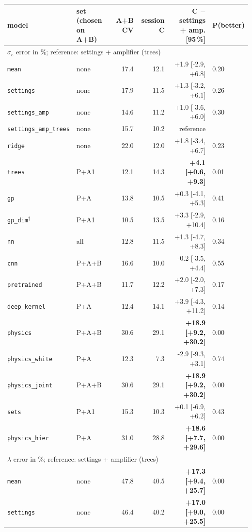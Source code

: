 \begin{tabular}{llrrrl}
\toprule
model & set (chosen on A+B) & A+B CV & session C & C $-$ settings + amp. [95\,\%] & P(better) \\
\midrule
\multicolumn{6}{l}{\textbf{$\sigma_e$} \quad error in \%; reference: settings + amplifier (trees)} \\
\midrule
\texttt{mean} & none & 17.4 & 12.1 & +1.9 [-2.9, +6.8] & 0.20 \\
\texttt{settings} & none & 17.9 & 11.5 & +1.3 [-3.2, +6.1] & 0.26 \\
\texttt{settings\_amp} & none & 14.6 & 11.2 & +1.0 [-3.6, +6.0] & 0.30 \\
\texttt{settings\_amp\_trees} & none & 15.7 & 10.2 & reference &  \\
\texttt{ridge} & none & 22.0 & 12.0 & +1.8 [-3.4, +6.7] & 0.23 \\
\texttt{trees} & P+A1 & 12.1 & 14.3 & \textbf{+4.1 [+0.6, +9.3]} & 0.01 \\
\texttt{gp} & P+A & 13.8 & 10.5 & +0.3 [-4.1, +5.3] & 0.41 \\
\texttt{gp\_dim}$^{\dagger}$ & P+A1 & 10.5 & 13.5 & +3.3 [-2.9, +10.4] & 0.16 \\
\texttt{nn} & all & 12.8 & 11.5 & +1.3 [-4.7, +8.3] & 0.34 \\
\texttt{cnn} & P+A+B & 16.6 & 10.0 & -0.2 [-3.5, +4.4] & 0.55 \\
\texttt{pretrained} & P+A+B & 11.7 & 12.2 & +2.0 [-2.0, +7.3] & 0.17 \\
\texttt{deep\_kernel} & P+A & 12.4 & 14.1 & +3.9 [-4.3, +11.2] & 0.14 \\
\texttt{physics} & P+A+B & 30.6 & 29.1 & \textbf{+18.9 [+9.2, +30.2]} & 0.00 \\
\texttt{physics\_white} & P+A & 12.3 & 7.3 & -2.9 [-9.3, +3.1] & 0.74 \\
\texttt{physics\_joint} & P+A+B & 30.6 & 29.1 & \textbf{+18.9 [+9.2, +30.2]} & 0.00 \\
\texttt{sets} & P+A1 & 15.3 & 10.3 & +0.1 [-6.9, +6.2] & 0.43 \\
\texttt{physics\_hier} & P+A & 31.0 & 28.8 & \textbf{+18.6 [+7.7, +29.6]} & 0.00 \\
\midrule
\multicolumn{6}{l}{\textbf{$\lambda$} \quad error in \%; reference: settings + amplifier (trees)} \\
\midrule
\texttt{mean} & none & 47.8 & 40.5 & \textbf{+17.3 [+9.4, +25.7]} & 0.00 \\
\texttt{settings} & none & 46.4 & 40.2 & \textbf{+17.0 [+9.0, +25.5]} & 0.00 \\

\end{tabular}
